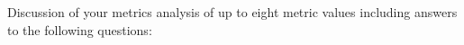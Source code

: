 Discussion of your metrics analysis of up to eight metric values including answers to the following questions:
